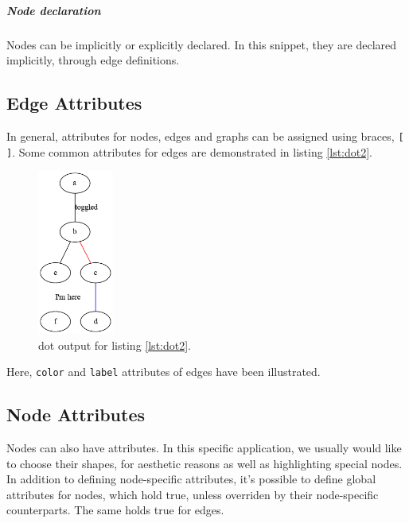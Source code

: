 \documentclass{article}
\begin{document}
	\subparagraph{Node declaration}
		Nodes can be implicitly or explicitly declared. In this snippet, they are declared implicitly, through edge definitions.
	
	\subsection{Edge Attributes}
	In general, attributes for nodes, edges and graphs can be assigned using braces, \lstinline{[ ]}. Some common attributes for edges are demonstrated in listing \ref{lst:dot2}.

	

	\begin{figure}[H]
		\begin{center}
			\includegraphics[width=25mm]{figure2.png}
		\end{center}
		\caption{dot output for listing \ref{lst:dot2}.}
		\label{fig:png2}
	\end{figure}

	Here, \lstinline{color} and \lstinline{label} attributes of edges have been illustrated. 

	\subsection{Node Attributes}
	Nodes can also have attributes. In this specific application, we usually would like to choose their shapes, for aesthetic reasons as well as highlighting special nodes. In addition to defining node-specific attributes, it's possible to define global attributes for nodes, which hold true, unless overriden by their node-specific counterparts. The same holds true for edges.

	
\end{document}
